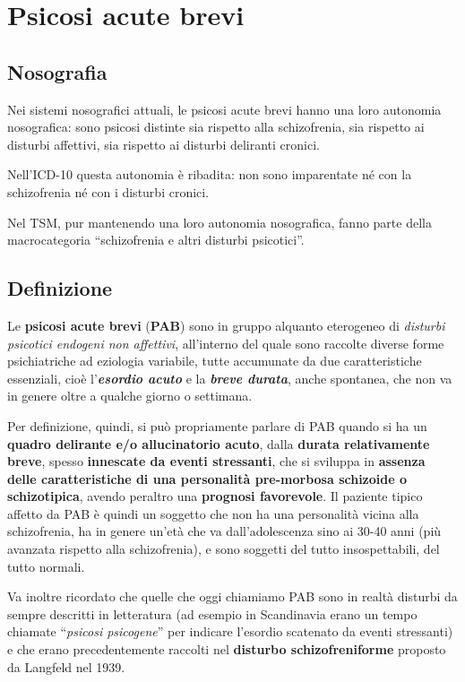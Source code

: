\section{Psicosi acute brevi}

\subsection{Nosografia}

Nei sistemi nosografici attuali, le psicosi acute brevi hanno una loro
autonomia nosografica: sono psicosi distinte sia rispetto alla
schizofrenia, sia rispetto ai disturbi affettivi, sia rispetto ai
disturbi deliranti cronici.

Nell'ICD-10 questa autonomia è ribadita: non sono imparentate né con la
schizofrenia né con i disturbi cronici.

Nel TSM, pur mantenendo una loro autonomia nosografica, fanno parte
della macrocategoria ``schizofrenia e altri disturbi psicotici''.

\subsection{Definizione}

Le \textbf{psicosi acute brevi} (\textbf{PAB}) sono in gruppo alquanto
eterogeneo di \emph{disturbi psicotici endogeni non affettivi},
all'interno del quale sono raccolte diverse forme psichiatriche ad
eziologia variabile, tutte accumunate da due caratteristiche essenziali,
cioè l'\textbf{\emph{esordio acuto}} e la \textbf{\emph{breve durata}},
anche spontanea, che non va in genere oltre a qualche giorno o
settimana.

Per definizione, quindi, si può propriamente parlare di PAB quando si ha
un \textbf{quadro delirante e/o allucinatorio acuto}, dalla
\textbf{durata relativamente breve}, spesso \textbf{innescate da eventi
stressanti}, che si sviluppa in \textbf{assenza delle caratteristiche di
una personalità pre-morbosa schizoide o schizotipica}, avendo peraltro
una \textbf{prognosi favorevole}. Il paziente tipico affetto da PAB è
quindi un soggetto che non ha una personalità vicina alla schizofrenia,
ha in genere un'età che va dall'adolescenza sino ai 30-40 anni (più
avanzata rispetto alla schizofrenia), e sono soggetti del tutto
insospettabili, del tutto normali.

Va inoltre ricordato che quelle che oggi chiamiamo PAB sono in realtà
disturbi da sempre descritti in letteratura (ad esempio in Scandinavia
erano un tempo chiamate ``\emph{psicosi psicogene}'' per indicare
l'esordio scatenato da eventi stressanti) e che erano precedentemente
raccolti nel \textbf{disturbo schizofreniforme} proposto da Langfeld nel
1939.

